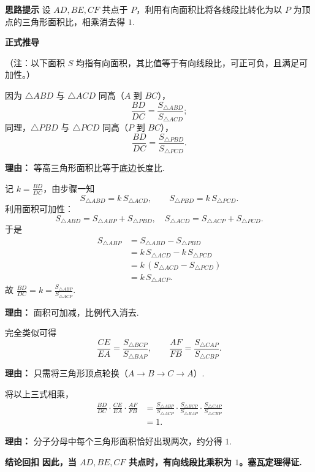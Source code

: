 \begin{proofbox}
	\textbf{\textcolor{CProof}{思路提示}}
	设 $AD,BE,CF$ 共点于 $P$，利用有向面积比将各线段比转化为以 $P$ 为顶点的三角形面积比，相乘消去得 $1$.

	\medskip
	\textbf{\textcolor{CProof}{正式推导}}

	\medskip
	\textcolor{CProof}{（注：以下面积 $S$ 均指有向面积，其比值等于有向线段比，可正可负，且满足可加性。）}

	\medskip
	\begin{description}[style=nextline, leftmargin=2.8em, labelsep=0.5em, itemsep=0.55em]
		\item[\textbf{步骤一（面积比代底边）：}]
			因为 $\triangle ABD$ 与 $\triangle ACD$ 同高（$A$ 到 $BC$），
			\[
				\frac{BD}{DC} = \frac{S_{\triangle ABD}}{S_{\triangle ACD}};
			\]
			同理，$\triangle PBD$ 与 $\triangle PCD$ 同高（$P$ 到 $BC$），
			\[
				\frac{BD}{DC} = \frac{S_{\triangle PBD}}{S_{\triangle PCD}}.
			\]
			\par \textbf{理由：} 等高三角形面积比等于底边长度比.
		\item[\textbf{步骤二（转化至P三角形）：}]
			记 $k = \frac{BD}{DC}$，由步骤一知
			\[
				S_{\triangle ABD} = k\,S_{\triangle ACD},
				\qquad
				S_{\triangle PBD} = k\,S_{\triangle PCD}.
			\]
			利用面积可加性：
			\[
				S_{\triangle ABD} = S_{\triangle ABP} + S_{\triangle PBD},\quad S_{\triangle ACD} = S_{\triangle ACP} + S_{\triangle PCD}.
			\]
			于是
			\[
				\begin{aligned}
					S_{\triangle ABP} &= S_{\triangle ABD} - S_{\triangle PBD} \\ &= k\,S_{\triangle ACD} - k\,S_{\triangle PCD} \\ &= k\,(S_{\triangle ACD} - S_{\triangle PCD}) \\ &= k\,S_{\triangle ACP}.
			\end{aligned}
			\]
			故 $\displaystyle\frac{BD}{DC}=k=\frac{S_{\triangle ABP}}{S_{\triangle ACP}}$. \par \textbf{理由：} 面积可加减，比例代入消去.
		\item[\textbf{步骤三（轮换对称得两比）：}]
			完全类似可得
			\[
				\frac{CE}{EA} = \frac{S_{\triangle BCP}}{S_{\triangle BAP}},
				\qquad
				\frac{AF}{FB} = \frac{S_{\triangle CAP}}{S_{\triangle CBP}}.
			\]
			\par \textbf{理由：} 只需将三角形顶点轮换（$A\to B\to C\to A$）.
		\item[\textbf{步骤四（乘积相消得1）：}]
			将以上三式相乘，
			\[
				\begin{aligned}
					\frac{BD}{DC}\cdot\frac{CE}{EA}\cdot\frac{AF}{FB} &= \frac{S_{\triangle ABP}}{S_{\triangle ACP}}\cdot\frac{S_{\triangle BCP}}{S_{\triangle BAP}}\cdot\frac{S_{\triangle CAP}}{S_{\triangle CBP}} \\ &= 1.
			\end{aligned}
			\]
			\par \textbf{理由：} 分子分母中每个三角形面积恰好出现两次，约分得 $1$.
	\end{description}

	\medskip
	\textbf{\textcolor{CProof}{结论回扣}}
	\textbf{因此，当 $AD,BE,CF$ 共点时，有向线段比乘积为 $1$。塞瓦定理得证.}
\end{proofbox}

